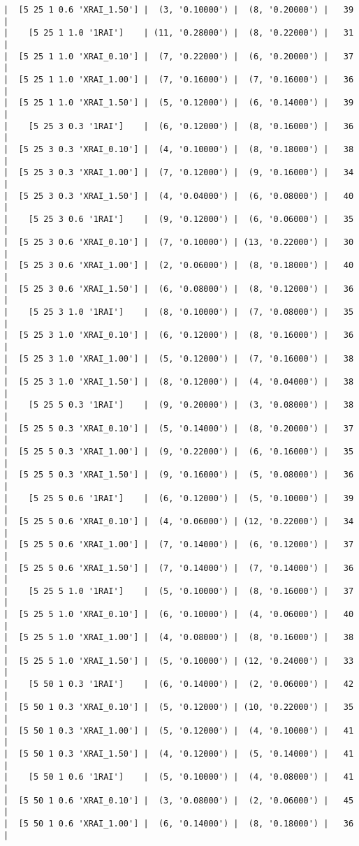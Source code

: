 \documentclass{article}
\begin{document}
\begin{verbatim}
|  [5 25 1 0.6 'XRAI_1.50'] |  (3, '0.10000') |  (8, '0.20000') |   39  |
|    [5 25 1 1.0 '1RAI']    | (11, '0.28000') |  (8, '0.22000') |   31  |
|  [5 25 1 1.0 'XRAI_0.10'] |  (7, '0.22000') |  (6, '0.20000') |   37  |
|  [5 25 1 1.0 'XRAI_1.00'] |  (7, '0.16000') |  (7, '0.16000') |   36  |
|  [5 25 1 1.0 'XRAI_1.50'] |  (5, '0.12000') |  (6, '0.14000') |   39  |
|    [5 25 3 0.3 '1RAI']    |  (6, '0.12000') |  (8, '0.16000') |   36  |
|  [5 25 3 0.3 'XRAI_0.10'] |  (4, '0.10000') |  (8, '0.18000') |   38  |
|  [5 25 3 0.3 'XRAI_1.00'] |  (7, '0.12000') |  (9, '0.16000') |   34  |
|  [5 25 3 0.3 'XRAI_1.50'] |  (4, '0.04000') |  (6, '0.08000') |   40  |
|    [5 25 3 0.6 '1RAI']    |  (9, '0.12000') |  (6, '0.06000') |   35  |
|  [5 25 3 0.6 'XRAI_0.10'] |  (7, '0.10000') | (13, '0.22000') |   30  |
|  [5 25 3 0.6 'XRAI_1.00'] |  (2, '0.06000') |  (8, '0.18000') |   40  |
|  [5 25 3 0.6 'XRAI_1.50'] |  (6, '0.08000') |  (8, '0.12000') |   36  |
|    [5 25 3 1.0 '1RAI']    |  (8, '0.10000') |  (7, '0.08000') |   35  |
|  [5 25 3 1.0 'XRAI_0.10'] |  (6, '0.12000') |  (8, '0.16000') |   36  |
|  [5 25 3 1.0 'XRAI_1.00'] |  (5, '0.12000') |  (7, '0.16000') |   38  |
|  [5 25 3 1.0 'XRAI_1.50'] |  (8, '0.12000') |  (4, '0.04000') |   38  |
|    [5 25 5 0.3 '1RAI']    |  (9, '0.20000') |  (3, '0.08000') |   38  |
|  [5 25 5 0.3 'XRAI_0.10'] |  (5, '0.14000') |  (8, '0.20000') |   37  |
|  [5 25 5 0.3 'XRAI_1.00'] |  (9, '0.22000') |  (6, '0.16000') |   35  |
|  [5 25 5 0.3 'XRAI_1.50'] |  (9, '0.16000') |  (5, '0.08000') |   36  |
|    [5 25 5 0.6 '1RAI']    |  (6, '0.12000') |  (5, '0.10000') |   39  |
|  [5 25 5 0.6 'XRAI_0.10'] |  (4, '0.06000') | (12, '0.22000') |   34  |
|  [5 25 5 0.6 'XRAI_1.00'] |  (7, '0.14000') |  (6, '0.12000') |   37  |
|  [5 25 5 0.6 'XRAI_1.50'] |  (7, '0.14000') |  (7, '0.14000') |   36  |
|    [5 25 5 1.0 '1RAI']    |  (5, '0.10000') |  (8, '0.16000') |   37  |
|  [5 25 5 1.0 'XRAI_0.10'] |  (6, '0.10000') |  (4, '0.06000') |   40  |
|  [5 25 5 1.0 'XRAI_1.00'] |  (4, '0.08000') |  (8, '0.16000') |   38  |
|  [5 25 5 1.0 'XRAI_1.50'] |  (5, '0.10000') | (12, '0.24000') |   33  |
|    [5 50 1 0.3 '1RAI']    |  (6, '0.14000') |  (2, '0.06000') |   42  |
|  [5 50 1 0.3 'XRAI_0.10'] |  (5, '0.12000') | (10, '0.22000') |   35  |
|  [5 50 1 0.3 'XRAI_1.00'] |  (5, '0.12000') |  (4, '0.10000') |   41  |
|  [5 50 1 0.3 'XRAI_1.50'] |  (4, '0.12000') |  (5, '0.14000') |   41  |
|    [5 50 1 0.6 '1RAI']    |  (5, '0.10000') |  (4, '0.08000') |   41  |
|  [5 50 1 0.6 'XRAI_0.10'] |  (3, '0.08000') |  (2, '0.06000') |   45  |
|  [5 50 1 0.6 'XRAI_1.00'] |  (6, '0.14000') |  (8, '0.18000') |   36  |

\end{verbatim}
\end{document}
